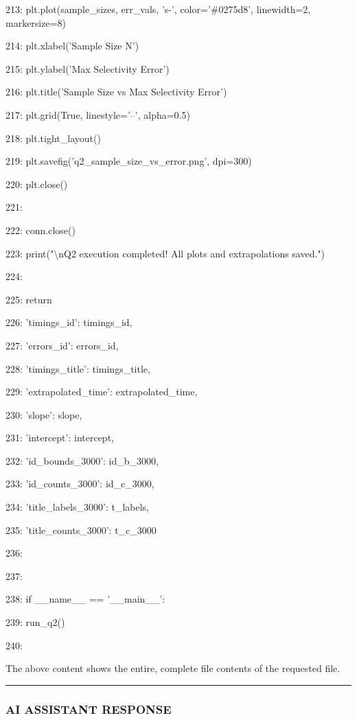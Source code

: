 \documentclass[11pt,a4paper]{article}
\begin{document}
{213:     plt.plot(sample\_sizes, err\_vals, 's-', color='\#0275d8', linewidth=2, markersize=8)

214:     plt.xlabel('Sample Size N')

215:     plt.ylabel('Max Selectivity Error')

216:     plt.title('Sample Size vs Max Selectivity Error')

217:     plt.grid(True, linestyle='--', alpha=0.5)

218:     plt.tight\_layout()

219:     plt.savefig('q2\_sample\_size\_vs\_error.png', dpi=300)

220:     plt.close()

221:

222:     conn.close()

223:     print("\textbackslash{}nQ2 execution completed! All plots and extrapolations saved.")

224:

225:     return {

226:         'timings\_id': timings\_id,

227:         'errors\_id': errors\_id,

228:         'timings\_title': timings\_title,

229:         'extrapolated\_time': extrapolated\_time,

230:         'slope': slope,

231:         'intercept': intercept,

232:         'id\_bounds\_3000': id\_b\_3000,

233:         'id\_counts\_3000': id\_c\_3000,

234:         'title\_labels\_3000': t\_labels,

235:         'title\_counts\_3000': t\_c\_3000

236:     }

237:

238: if \_\_name\_\_ == '\_\_main\_\_':

239:     run\_q2()

240:

The above content shows the entire, complete file contents of the requested file.


\hrule

\subsubsection{AI ASSISTANT RESPONSE}

}
\end{document}
